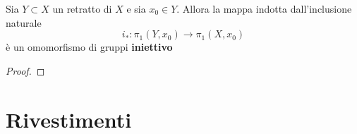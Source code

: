 \documentclass[]{article}
\begin{document}
\begin{lemma}  \nl
    Sia $Y \subset X$ un retratto di $X$ e sia $x_0 \in Y$. Allora la mappa indotta dall'inclusione naturale
    \[
        i_*: \pi_1(Y, x_0) \to \pi_1(X, x_0)
    \]
    \`e un omomorfismo di gruppi \textbf{iniettivo}
\end{lemma}

\begin{proof} \nl
   
\end{proof}

\section{Rivestimenti}
\end{document}

